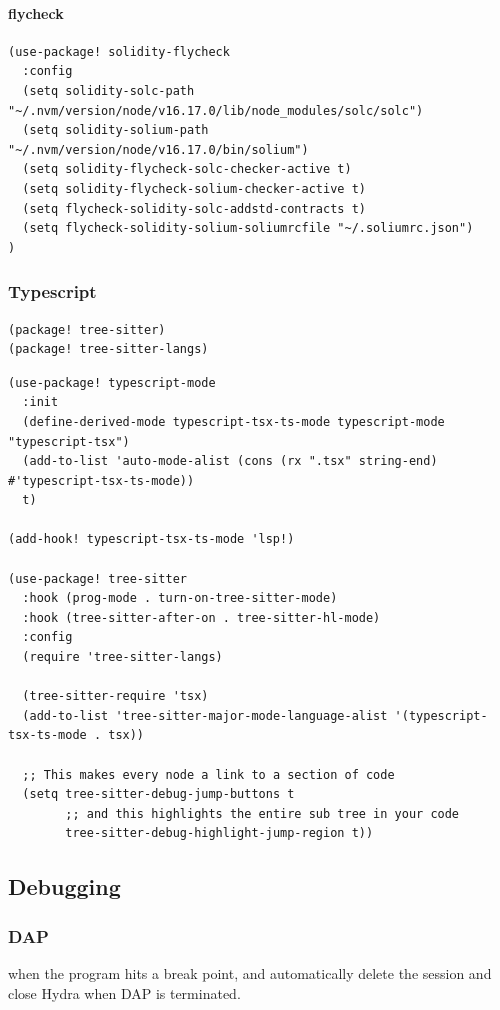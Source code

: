 \documentclass[11pt]{article}
\begin{document}
\paragraph{flycheck}
\label{sec:orgc2753a1}
\begin{verbatim}
(use-package! solidity-flycheck
  :config
  (setq solidity-solc-path "~/.nvm/version/node/v16.17.0/lib/node_modules/solc/solc")
  (setq solidity-solium-path "~/.nvm/version/node/v16.17.0/bin/solium")
  (setq solidity-flycheck-solc-checker-active t)
  (setq solidity-flycheck-solium-checker-active t)
  (setq flycheck-solidity-solc-addstd-contracts t)
  (setq flycheck-solidity-solium-soliumrcfile "~/.soliumrc.json")
)
\end{verbatim}

\subsubsection{Typescript}
\label{sec:orgaca926a}
\begin{verbatim}
(package! tree-sitter)
(package! tree-sitter-langs)
\end{verbatim}

\begin{verbatim}
(use-package! typescript-mode
  :init
  (define-derived-mode typescript-tsx-ts-mode typescript-mode "typescript-tsx")
  (add-to-list 'auto-mode-alist (cons (rx ".tsx" string-end) #'typescript-tsx-ts-mode))
  t)

(add-hook! typescript-tsx-ts-mode 'lsp!)

(use-package! tree-sitter
  :hook (prog-mode . turn-on-tree-sitter-mode)
  :hook (tree-sitter-after-on . tree-sitter-hl-mode)
  :config
  (require 'tree-sitter-langs)

  (tree-sitter-require 'tsx)
  (add-to-list 'tree-sitter-major-mode-language-alist '(typescript-tsx-ts-mode . tsx))

  ;; This makes every node a link to a section of code
  (setq tree-sitter-debug-jump-buttons t
        ;; and this highlights the entire sub tree in your code
        tree-sitter-debug-highlight-jump-region t))
\end{verbatim}

\subsection{Debugging}
\label{sec:org60f996b}
\subsubsection{DAP}
\label{sec:orgf354b5e}
when the program hits a break point, and automatically delete the session and
close Hydra when DAP is terminated.
\end{document}
